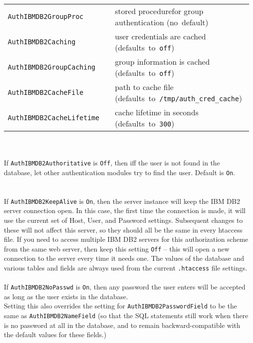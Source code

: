 \documentclass[11pt,a4paper]{article}
\begin{document}
\begin{tabular}{@{} ll >{\raggedright\arraybackslash}p{ 50ex } @{}}
{\tt AuthIBMDB2GroupProc} & & stored procedure\footnotemark[2] for group authentication \mbox{(no default)} \\

{\tt AuthIBMDB2Caching} & & user credentials are cached \mbox{(defaults to {\tt off})} \\

{\tt AuthIBMDB2GroupCaching} & & group information is cached \mbox{(defaults to {\tt off})} \\

{\tt AuthIBMDB2CacheFile} & & path to cache file \mbox{(defaults to {\tt /tmp/auth\_cred\_cache})} \\

{\tt AuthIBMDB2CacheLifetime} & & cache lifetime in seconds \mbox{(defaults to {\tt 300})} \\
\end{tabular}
\addtocounter{footnote}{1}
\normalsize
\\\\
If {\tt AuthIBMDB2Authoritative} is {\tt Off}, then iff the user is not found in the database, let other authentication modules try to find the user. Default is {\tt On}. \\
\\
\\
If {\tt AuthIBMDB2KeepAlive} is {\tt On}, then the server instance will keep the IBM DB2 server connection open.  In this case, the first time the connection is made, it will use the current set of Host, User, and Password settings.  Subsequent changes to these will not affect this server, so they should all be the same in every htaccess file. 
If you need to access multiple IBM DB2 servers for this authorization scheme from the same web server, then keep this setting {\tt Off} -- this will open a new connection to the server every time it needs one.  The values of the database and various tables and fields are always used from the current {\tt .htaccess} file settings.\\
\\
If {\tt AuthIBMDB2NoPasswd} is {\tt On}, then any password the user enters will be accepted as long as the user exists in the database.\\ Setting this also overrides the setting for {\tt AuthIBMDB2PasswordField} to be the same as {\tt AuthIBMDB2NameField} (so that the SQL statements still work when there is no password at all in the database, and to remain backward-compatible with the default values for these fields.)\\
\end{document}
